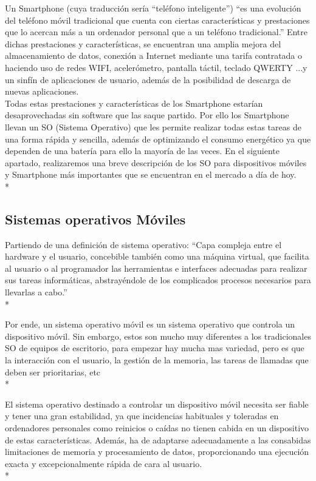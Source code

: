 \documentclass[../pfc.tex]{subfiles}
\begin{document}
	Un Smartphone (cuya traducción sería “teléfono inteligente”) “es una evolución del teléfono móvil tradicional que cuenta con ciertas características y prestaciones que lo acercan más a un ordenador personal que a un teléfono tradicional.”
	Entre dichas prestaciones y características, se encuentran una amplia mejora del almacenamiento de datos, conexión a Internet mediante una tarifa contratada o haciendo uso de redes WIFI, acelerómetro, pantalla táctil, teclado QWERTY ...y un sinfín de aplicaciones de usuario, además de la posibilidad de descarga de nuevas aplicaciones.\\
	Todas estas prestaciones y características de los Smartphone estarían desaprovechadas sin software que las saque partido. Por ello los Smartphone llevan un SO (Sistema Operativo) que les permite realizar todas estas tareas de una forma rápida y sencilla, además de optimizando el consumo energético ya que dependen de una batería para ello la mayoría de las veces. 
	En el siguiente apartado, realizaremos una breve descripción de los SO para dispositivos móviles y Smartphone más importantes que se encuentran en el mercado a día de hoy.\\*
	
	\subsection{Sistemas operativos Móviles}
	Partiendo de una definición de sistema operativo: “Capa compleja entre el hardware y el usuario, concebible también como una máquina virtual, que facilita al usuario o al programador las herramientas e interfaces adecuadas para realizar sus tareas informáticas, abstrayéndole de los complicados procesos necesarios para llevarlas a cabo.”\\*
	
	Por ende, un sistema operativo móvil es un sistema operativo que controla un dispositivo móvil. Sin embargo, estos son mucho muy diferentes a los tradicionales SO de equipos de escritorio, para empezar hay mucha mas variedad, pero es que la interacción con el usuario, la gestión de la memoria, las tareas de llamadas que deben ser prioritarias, etc\\*
	
	El sistema operativo destinado a controlar un dispositivo móvil necesita ser fiable y tener una gran estabilidad, ya que incidencias habituales y toleradas en ordenadores personales como reinicios o caídas no tienen cabida en un dispositivo de estas características. Además, ha de adaptarse adecuadamente a las consabidas limitaciones de memoria y procesamiento de datos, proporcionando una ejecución exacta y excepcionalmente rápida de cara al usuario.\\*
	
\end{document}
